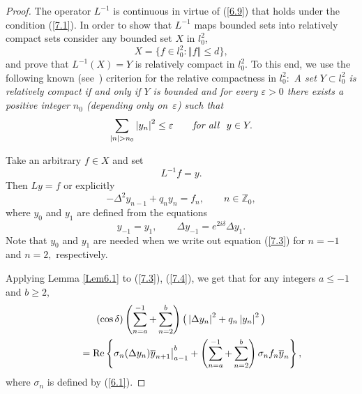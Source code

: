 \begin{proof}
The operator $L^{-1}$ is continuous in virtue of (\ref{6.9}) that holds
under the condition (\ref{7.1}). In order to show that $L^{-1}$ maps bounded
sets into relatively compact sets consider any bounded set $X$ in $l_{0}^{2}$,
\[
X=\big\{ f\in l_{0}^{2}:\left\Vert f\right\Vert \leq d\big\} ,
\]%
and prove that $L^{-1}(X)=Y$ is relatively compact in $l_{0}^{2}.$ To this
end, we use the following known (see~\cite{[17]}) criterion for the relative
compactness in $l_{0}^{2}:$ \textit{A set $Y\subset l_{0}^{2}$
is relatively compact if and only if  $Y$ is
bounded and for every $\varepsilon >0$ there exists a positive
integer $n_{0}$ (depending only on~$\varepsilon $) such
that}
\[
\sum_{\left\vert n\right\vert >n_{0}}\left\vert y_{n}\right\vert ^{2}\leq
\varepsilon \qquad \text{\textit{for all}} \ \ y\in Y.
\]

Take an arbitrary $f\in X$ and set
\[
L^{-1}f=y.
\]
Then $Ly=f$ or explicitly%
\begin{equation}
-\Delta ^{2}y_{n-1}+q_{n}y_{n}=f_{n},\qquad n\in
\mathbb{Z}
_{0},  \label{7.3}
\end{equation}%
where $y_{0}$ and $y_{1}$ are def\/ined from the equations%
\begin{equation}
y_{-1}=y_{1},\qquad \Delta y_{-1}=e^{2i\delta }\Delta y_{1}.
\label{7.4}
\end{equation}
Note that $y_{0}$ and $y_{1}$ are needed when we write out equation (\ref{7.3}) for $n=-1$ and $n=2,$ respectively.

Applying Lemma \ref{Lem6.1} to (\ref{7.3}), (\ref{7.4}), we get that for any
integers $a\leq -1$ and $b\geq 2,$%
\begin{gather}
(\cos \delta )\left( \sum_{n=a}^{-1}+\sum_{n=2}^{b}\right) \big(
\left\vert \Delta y_{n}\right\vert ^{2}+q_{n}\left\vert y_{n}\right\vert
^{2}\big)  \nonumber \\
\qquad {} ={\rm Re}\left\{ \sigma _{n}(\Delta y_{n})\overline{y}_{n+1}\big|_{a-1}^{b}+\left( \sum_{n=a}^{-1}+\sum_{n=2}^{b}\right) \sigma _{n}f_{n}%
\overline{y}_{n}\right\} ,  \label{7.5}
\end{gather}
where $\sigma _{n}$ is def\/ined by (\ref{6.1}).


\end{proof}
